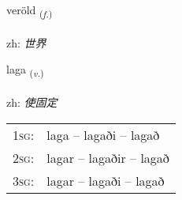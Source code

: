 \documentclass[frontgrid, backgrid]{flacards}\usepackage[]{graphicx}\usepackage[]{color}
\begin{document}
\renewcommand{\blhead}{\vskip5pt {\small\bfseries\footnotesize Nafnorð | 名词 }}
\renewcommand{\bcfoot}{\vskip5pt \hspace{2pt}{\small\bfseries\footnotesize 2K}}


{veröld \small{\textsubscript{(\textit{f.})}} \\[1ex] %
\textphonetic{[vɛːrœlt]} \\
zh: \emph{世界} \\  [2ex]
\renewcommand*{\arraystretch}{0.8}
}

\renewcommand{\flhead}{\vskip5pt \fboxsep=0pt {\small\bfseries\footnotesize Sagnorð | 动词}}
\renewcommand{\fcfoot}{\vskip5pt \fboxsep=0pt \hspace{2pt}{\small\bfseries\footnotesize 2K}}

\renewcommand{\blhead}{\vskip5pt {\small\bfseries\footnotesize Sagnorð | 动词 }}
\renewcommand{\bcfoot}{\vskip5pt \hspace{2pt}{\small\bfseries\footnotesize 2K}}


{laga \small{\textsubscript{(\textit{v.})}} \\[1ex] %
\textphonetic{[laːɣa]} \\
zh: \emph{使固定} \\  [2ex]
\renewcommand*{\arraystretch}{0.8}
\begin{tabular}{p{1cm}l}
\textsc{1sg}: & laga -- lagaði -- lagað \\ 
\textsc{2sg}: & lagar -- lagaðir -- lagað \\ 
\textsc{3sg}: & lagar -- lagaði -- lagað \\ 
\end{tabular}
}

\renewcommand{\flhead}{\vskip5pt \fboxsep=0pt {\small\bfseries\footnotesize Sagnorð | 动词}}
\renewcommand{\fcfoot}{\vskip5pt \fboxsep=0pt \hspace{2pt}{\small\bfseries\footnotesize 2K}}
\end{document}
